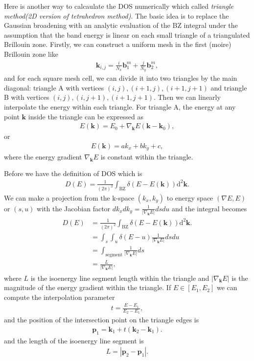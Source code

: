 \documentclass[10pt, oneside]{article}
\newcommand{\mr}[1]{\mathrm{#1}}
\newcommand{\p}[1]{\left(#1\right)}
\newcommand{\bb}[1]{\left[#1\right]}
\newcommand{\bv}[1]{\left|#1\right|}
\begin{document}
Here is another way to calcaulate the DOS numerically which called \textit{triangle method(2D version of tetrahedron method)}. The basic idea is to replace the Gaussian broadening with an analytic evaluation of the BZ integral under the assumption that the band energy is linear on each small triangle of a triangulated Brillouin zone. Firstly, we can construct a uniform mesh in the first (moire) Brillouin zone like 
\begin{align}
	\bm{k}_{i,j} = \frac{i}{N_{x}} \bm{b}^{m}_{1} + \frac{j}{N_{y}} \bm{b}^{m}_{2},
\end{align}
and for each square mesh cell, we can divide it into two triangles by the main diagonal: triangle A with vertices \(\p{i,j},\p{i+1, j}, \p{i+1, j+1}\) and triangle B with vertices \(\p{i,j},\p{i, j+1}, \p{i+1, j+1}\). Then we can linearly interpolate the energy within each triangle. For triangle A, the energy at any point \(\bm{k}\) inside the triangle can be expressed as
\begin{align}
	E\p{\bm{k}} = E_0 + \nabla_{\bm{k}}E \p{\bm{k} - \bm{k}_0},
\end{align}
or 
\begin{align}
	E\p{\bm{k}} = a k_x + b k_y + c,
\end{align}
where the energy gradient \(\nabla_{\bm{k}} E\) is constant within the triangle.   

Before we have the definition of DOS which is 
\begin{align}
	D\p{E} = \frac{1}{\p{2 \pi}^2} \int_{\mr{BZ}} \delta \p{E - E\p{\bm{k}}} \mr{d}^{2} \bm{k}.
\end{align}
We can make a projection from the k-space \(\p{k_x, k_y}\) to energy space \(\p{\nabla E, E}\) or \(\p{s,u}\) with the Jacobian factor \(dk_x dk_{y} = \frac{1}{\bv{\nabla_{\bm{k}} E}} ds du\) and the integral becomes
\begin{align} \label{DOS}
	\begin{split}
		D\p{E}  & =  \frac{1}{\p{2 \pi}^2} \int_{\mr{BZ}} \delta \p{E - E\p{\bm{k}}} \mr{d}^{2} \bm{k}. \\
		& = \int_{s} \int_{u} \delta \p{E - u} \frac{1}{\bv{\nabla_{\bm{k}} E}} ds du \\
		& = \int_{\mr{segment}} \frac{1}{ \bv{\nabla_{\bm{k}} E}} ds \\
		& = \frac{L}{\bv{\nabla_{\bm{k}} E}},
	\end{split}
\end{align} 
where \(L\) is  the isoenergy line segment length within the triangle and \(\bv{\nabla_{\bm{k}} E}\) is the magnitude of the energy gradient within the triangle. If \(E \in  \bb{E_1, E_2}\) we can compute the interpolation parameter 
\begin{align}
	t = \frac{E - E_1}{E_2 - E_1},
\end{align}
and the position of the intersection point on the triangle edges is 
\begin{align}
	\bm{p}_{1} = \bm{k}_1 + t \p{\bm{k}_2 - \bm{k}_1}.
\end{align}
and the length of the isoenergy line segment is
\begin{align}
	L = \bv{\bm{p}_2 - \bm{p}_1}. 
\end{align}
\end{document}

